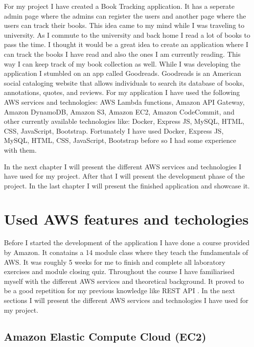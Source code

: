 \documentclass[11pt,a4paper,oneside]{report}
\begin{document}
For my project I have created a Book Tracking application.
It has a seperate admin page where the admins can register the users and another page where the users can track their books.
This idea came to my mind while I was traveling to university. As I commute to the university and back home I read a lot of books to pass the time.
I thought it would be a great idea to create an application where I can track the books I have read and also the ones I am currently reading.
This way I can keep track of my book collection as well. While I was developing the application I stumbled on an app called Goodreads. Goodreads is an American social cataloging website that allows individuals to search its database of books, annotations, quotes, and reviews.\cite{goodreads}
For my application I have used the following AWS services and technologies: AWS Lambda functions, Amazon API Gateway, Amazon DynamoDB, Amazon S3, Amazon EC2, Amazon CodeCommit, and other currently available technologies like:  Docker, Express JS, MySQL, HTML, CSS, JavaScript, Bootstrap.
Fortunately I have used Docker, Express JS, MySQL, HTML, CSS, JavaScript, Bootstrap before so I had some experience with them.

In the next chapter I will present the different AWS services and technologies I have used for my project. After that I will present the development phase of the project. In the last chapter I will present the finished application and showcase it.
\chapter{Used AWS features and techologies}

Before I started the development of the application I have done a course provided by Amazon. It conatains a 14 module class where they teach the fundamentals of AWS.
It was roughly 5 weeks for me to finish and complete all laboratory exercises and module closing quiz. Throughout the course I have familiarised myself with the different AWS services and theoretical background. It proved to be a good repetition for my previous knowledge like REST API  \cite{awsacademy}.
In the next sections I will present the different AWS services and technologies I have used for my project.

\section{Amazon Elastic Compute Cloud (EC2)}
\end{document}
